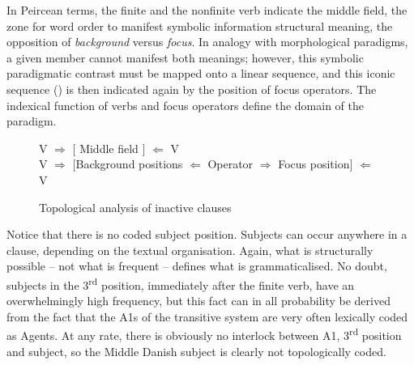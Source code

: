 \documentclass[output=paper]{langscibook}
\begin{document}
\begin{table}
    \caption{Information structure and word order in Middle Danish\label{tab:heltoft:8}}
\end{table}



In Peircean terms, the finite and the nonfinite verb indicate the middle field, the zone for word order to manifest symbolic information structural meaning, the opposition of \textit{background} versus \textit{focus}. In analogy with morphological paradigms, a given member cannot manifest both meanings; however, this symbolic paradigmatic contrast must be mapped onto a linear sequence, and this iconic sequence (\citealt{Heltoft2019, Heltoft2003}) is then indicated again by the position of focus operators. The indexical function of verbs and focus operators define the domain of the paradigm.

\begin{figure}
\centering
  {V} ${\Rightarrow}$  [\hspace{3.1cm} {Middle field} \hspace{3.1cm}] ${\Leftarrow}$  {V}\\
  {V}  ${\Rightarrow}$ {[Background positions}  ${\Leftarrow}$  {Operator} ${\Rightarrow}$   {Focus position]}  ${\Leftarrow}$    {V}
  \caption{Topological analysis of inactive clauses\label{fig:heltoft:2}}
\end{figure}    


Notice that there is no coded subject position. Subjects can occur anywhere in a clause, depending on the textual organisation. Again, what is structurally possible -- not what is frequent -- defines what is grammaticalised. No doubt, subjects in the 3\textsuperscript{rd} position, immediately after the finite verb, have an overwhelmingly high frequency, but this fact can in all probability be derived from the fact that the A1s of the transitive system are very often lexically coded as Agents. At any rate, there is obviously no interlock between A1, 3\textsuperscript{rd} position and subject, so the Middle Danish subject is clearly not topologically coded.
\end{document}
